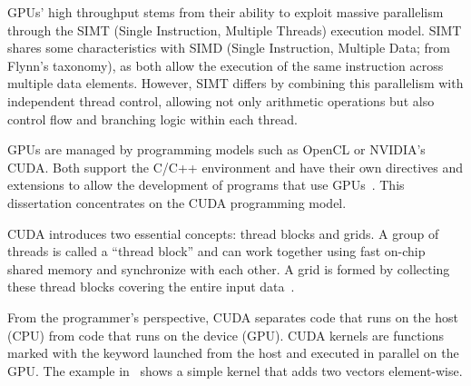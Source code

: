 \documentclass[Ingles,Final]{ic-tese-v3}
\begin{document}
GPUs' high throughput stems from their ability to exploit massive parallelism through the SIMT (Single Instruction, Multiple Threads) execution model. SIMT shares some characteristics with SIMD (Single Instruction, Multiple Data; from Flynn's taxonomy), as both allow the execution of the same instruction across multiple data elements. However, SIMT differs by combining this parallelism with independent thread control, allowing not only arithmetic operations but also control flow and branching logic within each thread\cite{cuda}.

GPUs are managed by programming models such as OpenCL or NVIDIA's CUDA. Both support the C/C++ environment and have their own directives and extensions to allow the development of programs that use GPUs~\cite{kirk}. This dissertation concentrates on the CUDA programming model.

CUDA introduces two essential concepts: thread blocks and grids. A group of threads is called a ``thread block'' and can work together using fast on-chip shared memory and synchronize with each other. A grid is formed by collecting these thread blocks covering the entire input data~\cite{cuda}.

From the programmer's perspective, CUDA separates code that runs on the host (CPU) from code that runs on the device (GPU). CUDA kernels are functions marked with the  keyword launched from the host and executed in parallel on the GPU. The example in~ shows a simple kernel that adds two vectors element-wise.
\end{document}
